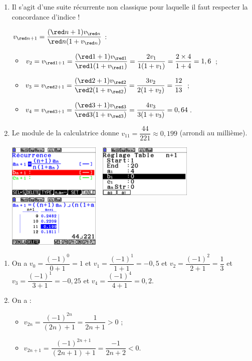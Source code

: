 \documentclass[a4paper,11pt]{article}
\begin{document}
\begin{enumerate}[itemsep=0pt]
	\item Il s'agit d'une suite récurrente \og non classique \fg{} pour laquelle il faut respecter la concordance d'indice !
	
	$v_{{\red n}+1}=\dfrac{({\red n}+1)v_{\red n}}{{\red n}(1+v_{\red n})}$ :
	\begin{itemize}
		\item $v_2=v_{{\red 1}+1}=\dfrac{({\red 1}+1)v_{\red 1}}{{\red 1}(1+v_{\red 1})}=\dfrac{2v_1}{1(1+v_1)}=\dfrac{2 \times 4}{1+4}=1,6$ ;
		\item $v_3=v_{{\red 2}+1}=\dfrac{({\red 2}+1)v_{\red 2}}{{\red 2}(1+v_{\red 2})}=\dfrac{3v_2}{2(1+v_2)}=\dfrac{12}{13}$ ;
		\item $v_4=v_{{\red 3}+1}=\dfrac{({\red 3}+1)v_{\red 3}}{{\red 3}(1+v_{\red 3})}=\dfrac{4v_3}{3(1+v_3)}=0,64$.
	\end{itemize}
	\item Le module  de la calculatrice donne $v_{11}=\dfrac{44}{221}\approx 0,199$ (arrondi au millième).
	\begin{center}
		\includegraphics[height=2.5cm]{chap02_exos_corr_6a}~~\includegraphics[height=2.5cm]{chap02_exos_corr_6b}~~\includegraphics[height=2.5cm]{chap02_exos_corr_6c}
	\end{center}
\end{enumerate}

\medskip


\begin{enumerate}[itemsep=0pt]
	\item On a $v_0=\dfrac{(-1)^0}{0+1}=1$ et $v_1=\dfrac{(-1)^1}{1+1}=-0,5$ et $v_2=\dfrac{(-1)^2}{2+1}=\dfrac13$ et $v_3=\dfrac{(-1)^1}{3+1}=-0,25$ et $v_4=\dfrac{(-1)^4}{4+1}=0,2$.
	\item On a :
	\begin{itemize}
		\item $v_{2n}=\dfrac{(-1)^{2n}}{(2n)+1}=\dfrac{1}{2n+1} > 0$ ;
		\item $v_{2n+1}=\dfrac{(-1)^{2n+1}}{(2n+1)+1}=\dfrac{-1}{2n+2} < 0$.
	\end{itemize}
\end{enumerate}
\end{document}
